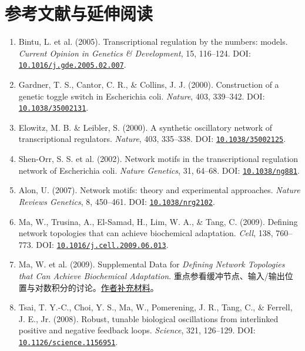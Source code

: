 \chapter*{参考文献与延伸阅读}
\begin{enumerate}[leftmargin=*,itemsep=2pt,parsep=0pt]\small
\item Bintu, L. et al. (2005). Transcriptional regulation by the numbers: models. \emph{Current Opinion in Genetics \& Development}, 15, 116--124. DOI: \href{https://doi.org/10.1016/j.gde.2005.02.007}{\nolinkurl{10.1016/j.gde.2005.02.007}}.
\item Gardner, T. S., Cantor, C. R., \& Collins, J. J. (2000). Construction of a genetic toggle switch in Escherichia coli. \emph{Nature}, 403, 339--342. DOI: \href{https://doi.org/10.1038/35002131}{\nolinkurl{10.1038/35002131}}.
\item Elowitz, M. B. \& Leibler, S. (2000). A synthetic oscillatory network of transcriptional regulators. \emph{Nature}, 403, 335--338. DOI: \href{https://doi.org/10.1038/35002125}{\nolinkurl{10.1038/35002125}}.
\item Shen-Orr, S. S. et al. (2002). Network motifs in the transcriptional regulation network of Escherichia coli. \emph{Nature Genetics}, 31, 64--68. DOI: \href{https://doi.org/10.1038/ng881}{\nolinkurl{10.1038/ng881}}.
\item Alon, U. (2007). Network motifs: theory and experimental approaches. \emph{Nature Reviews Genetics}, 8, 450--461. DOI: \href{https://doi.org/10.1038/nrg2102}{\nolinkurl{10.1038/nrg2102}}.
\item Ma, W., Trusina, A., El-Samad, H., Lim, W. A., \& Tang, C. (2009). Defining network topologies that can achieve biochemical adaptation. \emph{Cell}, 138, 760--773. DOI: \href{https://doi.org/10.1016/j.cell.2009.06.013}{\nolinkurl{10.1016/j.cell.2009.06.013}}.
\item Ma, W. et al. (2009). Supplemental Data for \emph{Defining Network Topologies that Can Achieve Biochemical Adaptation}. 重点参看缓冲节点、输入/输出位置与对数积分的讨论。\href{https://ucsf-cmp.github.io/lim-lab/papers/pdfs/wm_2009_supp.pdf}{作者补充材料}。
\item Tsai, T. Y.-C., Choi, Y. S., Ma, W., Pomerening, J. R., Tang, C., \& Ferrell, J. E., Jr. (2008). Robust, tunable biological oscillations from interlinked positive and negative feedback loops. \emph{Science}, 321, 126--129. DOI: \href{https://doi.org/10.1126/science.1156951}{\nolinkurl{10.1126/science.1156951}}.
\end{enumerate}
